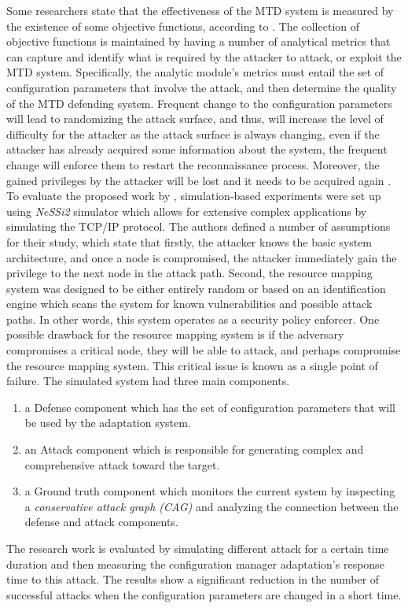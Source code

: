 Some researchers state that the effectiveness of the MTD system is measured by the existence of some objective functions, according to . The collection of objective functions is maintained by having a number of analytical metrics that can capture and identify what is required by the attacker to attack, or exploit the MTD system. Specifically, the analytic module's metrics must entail the set of configuration parameters that involve the attack, and then determine the quality of the MTD defending system. Frequent change to the configuration parameters will lead to randomizing the attack surface, and thus, will increase the level of difficulty for the attacker as the attack surface is always changing, even if the attacker has already acquired some information about the system, the frequent change will enforce them to restart the reconnaissance process. Moreover, the gained privileges by the attacker will be lost and it needs to be acquired again . 
 To evaluate the proposed work by , simulation-based experiments were set up using \textit{NeSSi2} simulator  which allows for extensive complex applications by simulating the TCP/IP protocol. The authors defined a number of assumptions for their study, which state that firstly, the attacker knows the basic system architecture, and once a node is compromised, the attacker immediately gain the privilege to the next node in the attack path. Second, the resource mapping system was designed to be either entirely random or based on an identification engine which scans the system for known vulnerabilities and possible attack paths. 
 In other words, this system operates as a security policy enforcer. One possible drawback for the resource mapping system is if the adversary compromises a critical node, they will be able to attack, and perhaps compromise the resource mapping system. This critical issue is known as a single point of failure. The simulated system had three main components. 
 \begin{enumerate}
     \item a Defense component which has the set of configuration parameters that will be used by the adaptation system. 
     \item an Attack component which is responsible for generating complex and comprehensive attack toward the target. 
     \item a Ground truth component which monitors the current system by inspecting a \textit{conservative attack graph (CAG)} and analyzing the connection between the defense and attack components. 
 \end{enumerate}
 The research work is evaluated by simulating different attack for a certain time duration and then measuring the configuration manager adaptation's response time to this attack. The results show a significant reduction in the number of successful attacks when the configuration parameters are changed in a short time.

